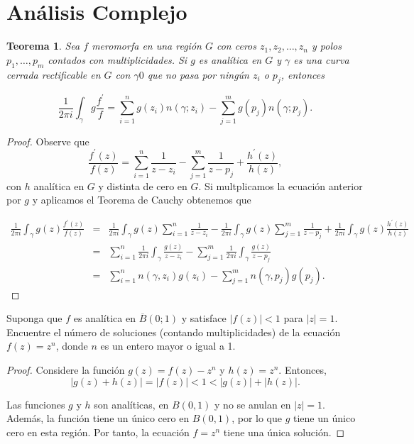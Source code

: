 \documentclass[12pt]{article}
\newtheorem{teo}{Teorema}
\newenvironment{problem}[2][Problema]{\begin{trivlist}
\item[\hskip \labelsep {\bfseries #1}\hskip \labelsep {\bfseries #2.}]}{\end{trivlist}}
\begin{document}
\section*{Análisis Complejo}

\begin{teo} Sea $f$ meromorfa en una región $G$ con ceros $z_1, z_2, \ldots, z_n$ y polos $p_1, \ldots, p_m$ contados con multiplicidades. Si $g$ es analítica en $G$ y $\gamma$ es una curva cerrada rectificable en $G$ con $\gamma 0$ que no pasa por ningún $z_i$ o $p_j$, entonces

$$ \frac{1}{2\pi i} \int_\gamma g \frac{f^\prime}{f} = \sum_{i=1}^n g(z_i) n(\gamma; z_i) - \sum_{j=1}^m g(p_j) n(\gamma; p_j).$$
\end{teo}
\begin{proof} Observe que 
$$ \frac{f^\prime(z)}{f(z)} = \sum_{i=1}^n \frac{1}{z-z_i} - \sum_{j=1}^m \frac{1}{z-p_j} + \frac{h^\prime(z)}{h(z)},$$
con $h$ analítica en $G$ y distinta de cero en $G.$ Si multplicamos la ecuación anterior por $g$ y aplicamos el Teorema de Cauchy obtenemos que 

\begin{eqnarray*}
\frac{1}{2\pi i} \int_\gamma g(z) \frac{ f^\prime(z)}{f(z)} &=& \frac{1}{2\pi i} \int_\gamma g(z) \sum_{i=1}^n \frac{1}{z-z_i} - \frac{1}{2\pi i} \int_\gamma g(z) \sum_{j=1}^m \frac{1}{z-p_j} + \frac{1}{2\pi i} \int_\gamma g(z)
\frac{h^\prime(z)}{h(z)}\\
&=& \sum_{i=1}^n \frac{1}{2 \pi i} \int_\gamma \frac{g(z)}{z-z_i} - \sum_{j=1}^m \frac{1}{2\pi i} \int_\gamma \frac{g(z)}{z-p_j}\\
&=& \sum_{i=1}^n n(\gamma, z_i)g(z_i) - \sum_{j=1}^m n(\gamma, p_j) g(p_j). 
\end{eqnarray*}
\end{proof}


\begin{problem}{2. pp. 126 } Suponga que $f$ es analítica en $\overline{B}(0;1)$ y satisface $\lvert f(z) \rvert < 1$ para $\lvert z \rvert = 1.$ Encuentre el número de soluciones (contando multiplicidades) de la ecuación $f(z) = z^n$, donde $n$ es un entero mayor o igual a 1. 
\end{problem}
\begin{proof}
Considere la función $g(z) = f(z) - z^n$ y $h(z) = z^n.$ Entonces, 
$$ \lvert g(z) + h(z) \rvert = \lvert f(z) \rvert < 1 < \lvert g(z) \rvert + \lvert h(z) \rvert.$$

Las funciones $g$ y $h$ son analíticas, en $B(0, 1)$ y no se anulan en $\lvert z \rvert = 1.$ Además, la función tiene un único cero en $B(0, 1)$, por lo que $g$ tiene un único cero en esta región. Por tanto, la ecuación $f = z^n$ tiene una única solución.
\end{proof}
\end{document}
